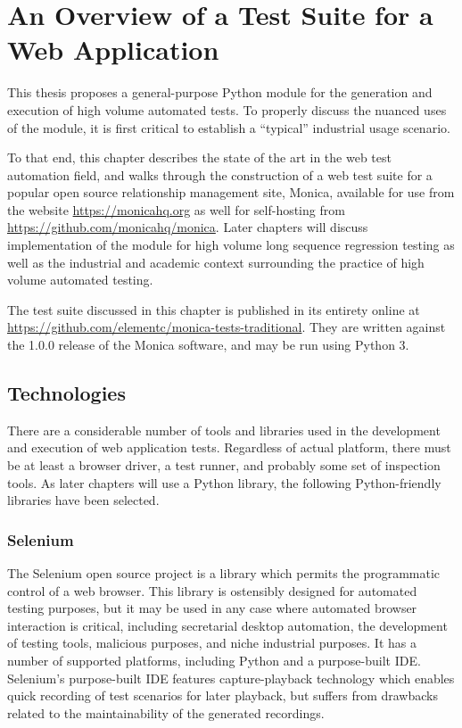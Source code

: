 \chapter{An Overview of a Test Suite for a Web Application}
This thesis proposes a general-purpose Python module for the generation and execution of high volume automated tests. To properly discuss the nuanced uses of the module, it is first critical to establish a ``typical'' industrial usage scenario.

To that end, this chapter describes the state of the art in the web test automation field, and walks through the construction of a web test suite for a popular open source relationship management site, Monica, available for use from the website \url{https://monicahq.org} as well for self-hosting from \url{https://github.com/monicahq/monica}. Later chapters will discuss implementation of the module for high volume long sequence regression testing as well as the industrial and academic context surrounding the practice of high volume automated testing.

The test suite discussed in this chapter is published in its entirety online at \url{https://github.com/elementc/monica-tests-traditional}. They are written against the 1.0.0 release of the Monica software, and may be run using Python 3.

\section{Technologies}
There are a considerable number of tools and libraries used in the development and execution of web application tests.\citep{kaur2013comparative} Regardless of actual platform, there must be at least a browser driver, a test runner, and probably some set of inspection tools. As later chapters will use a Python library, the following Python-friendly libraries have been selected.

\subsection{Selenium}
The Selenium open source project is a library which permits the programmatic control of a web browser.\citep{holmes2006automating} This library is ostensibly designed for automated testing purposes\citep{razak2011agile}, but it may be used in any case where automated browser interaction is critical, including secretarial desktop automation, the development of testing tools, malicious purposes, and niche industrial purposes.\citep{kongsli2007security} It has a number of supported platforms, including Python and a purpose-built IDE.\citep{bruns2009web} Selenium's purpose-built IDE features capture-playback technology which enables quick recording of test scenarios for later playback, but suffers from drawbacks related to the maintainability of the generated recordings.\citep{leotta2013capture}

